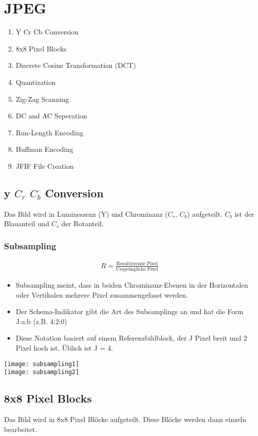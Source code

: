 \section{JPEG}
\begin{enumerate}
	\item Y Cr Cb Conversion
	\item 8x8 Pixel Blocks
	\item Discrete Cosine Transformation (DCT)
	\item Quantization
	\item Zig-Zag Scanning
	\item DC and AC Seperation
	\item Run-Length Encoding
	\item Huffman Encoding
	\item JFIF File Creation
\end{enumerate}
\subsection{y $C_r$ $C_b$ Conversion}
Das Bild wird  in Lumineszenz (Y) und Chrominanz ($C_r$, $C_b$) aufgeteilt.
$C_b$ ist der Blauanteil und $C_r$ der Rotanteil.
\subsubsection{Subsampling}
\begin{align*}
	R = \frac{\text{Resultierende Pixel}}{\text{Ursprüngliche Pixel}}
\end{align*}
\begin{itemize}
	\item Subsampling meint, dass in beiden Chrominanz-Ebenen in der
	      Horizontalen oder Vertikalen mehrere Pixel zusammengefasst werden.
	\item Der Schema-Indikator gibt die Art des Subsamplings an und hat die
	      Form J:a:b (z.B. 4:2:0)
	\item Diese Notation basiert auf einem Referenzbildblock, der J Pixel breit und
	      2 Pixel hoch ist. Üblich ist J = 4.
\end{itemize}
\texttt{[image: subsampling1]}\\
\texttt{[image: subsampling2]}

\subsection{8x8 Pixel Blocks}
Das Bild wird in 8x8 Pixel Blöcke aufgeteilt. Diese Blöcke werden dann einzeln bearbeitet.
